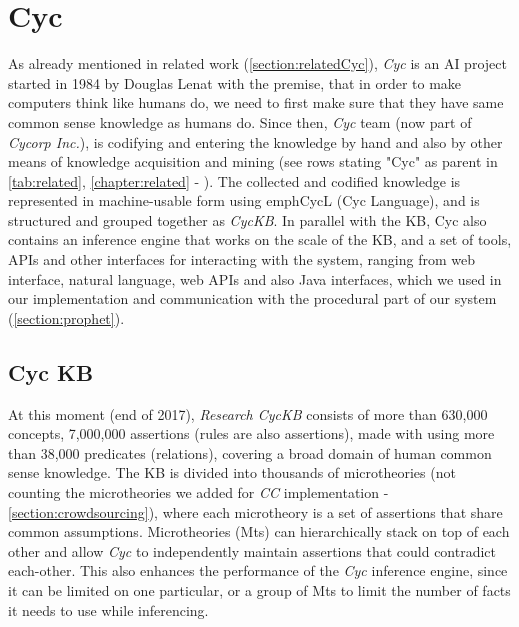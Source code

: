 \section{Cyc}
\label{section:Cyc}
As already mentioned in related work (\autoref{section:relatedCyc}), \emph{Cyc}
is an AI project started in 1984 by Douglas Lenat\parencite{Lenat1985} with the
premise, that in order to make computers think like humans do, we need to first
make sure that they have same common sense knowledge as humans do. Since then,
\emph {Cyc} team (now part of \emph{Cycorp Inc.}), is codifying and entering 
the knowledge by hand and also by other means of knowledge acquisition and 
mining (see rows stating "Cyc" as parent in \autoref{tab:related}, 
\autoref{chapter:related} - ). 
The collected and codified knowledge is represented in machine-usable form 
using emph{CycL (Cyc Language)}, and is structured and grouped together as
\emph{CycKB}. In parallel with the KB, Cyc also contains an inference engine
that works on the scale of the KB, and a set of tools, APIs and other interfaces
for interacting with the system, ranging from web interface, natural language,
web APIs and also Java interfaces, which we used in our implementation and
communication with the procedural part of our system 
(\autoref{section:prophet}).

\subsection{Cyc KB}
\label{section:cyckb}
At this moment (end of 2017), \emph{Research CycKB} consists of more than 
630,000 concepts, 7,000,000 assertions (rules are also assertions), made with
using more than 38,000 predicates (relations), covering a broad domain of
human common sense knowledge. The KB is divided into thousands of microtheories
(not counting the microtheories we added for \emph{CC} implementation - 
\autoref{section:crowdsourcing}), where each microtheory is a set of assertions
that share common assumptions. Microtheories (Mts) can hierarchically stack on 
top of each other and allow \emph{Cyc} to independently maintain assertions that
could contradict each-other. This also enhances the performance of the 
\emph{Cyc} inference engine, since it can be limited on one particular, or a
group of Mts to limit the number of facts it needs to use while inferencing.

